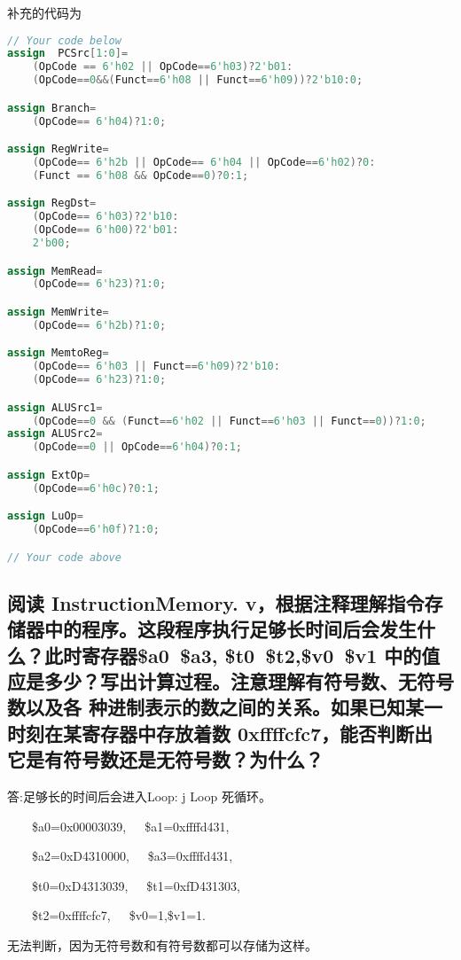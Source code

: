 \documentclass{ctexart}
\begin{document}
        补充的代码为
        	\begin{lstlisting}[language=verilog]
// Your code below
assign 	PCSrc[1:0]=
    (OpCode == 6'h02 || OpCode==6'h03)?2'b01:
    (OpCode==0&&(Funct==6'h08 || Funct==6'h09))?2'b10:0;

assign Branch=
    (OpCode== 6'h04)?1:0;

assign RegWrite=
    (OpCode== 6'h2b || OpCode== 6'h04 || OpCode==6'h02)?0:
    (Funct == 6'h08 && OpCode==0)?0:1;

assign RegDst=
    (OpCode== 6'h03)?2'b10:
    (OpCode== 6'h00)?2'b01:
    2'b00;

assign MemRead=
    (OpCode== 6'h23)?1:0;

assign MemWrite=
    (OpCode== 6'h2b)?1:0;

assign MemtoReg=
    (OpCode== 6'h03 || Funct==6'h09)?2'b10:
    (OpCode== 6'h23)?1:0;

assign ALUSrc1=
    (OpCode==0 && (Funct==6'h02 || Funct==6'h03 || Funct==0))?1:0;
assign ALUSrc2=
    (OpCode==0 || OpCode==6'h04)?0:1;

assign ExtOp=
    (OpCode==6'h0c)?0:1;

assign LuOp=
    (OpCode==6'h0f)?1:0;

// Your code above
    \end{lstlisting}
        \subsection{ 阅读 InstructionMemory.   
        v，根据注释理解指令存储器中的程序。这段程序执行足够长时间后会发生什么？此时寄存器\$a0~\$a3,
        \$t0~\$t2,\$v0~\$v1 中的值应是多少？写出计算过程。注意理解有符号数、无符号数以及各
        种进制表示的数之间的关系。如果已知某一时刻在某寄存器中存放着数 0xffffcfc7，能否判断出
    它是有符号数还是无符号数？为什么？}
            答:足够长的时间后会进入Loop: j Loop 死循环。
            
            ~~~~\$a0=0x00003039,~~~\$a1=0xffffd431,
            
            ~~~~\$a2=0xD4310000,~~~\$a3=0xffffd431,
            
            ~~~~\$t0=0xD4313039,~~~\$t1=0xfD431303,
            
            ~~~~\$t2=0xffffcfc7,~~~\$v0=1,\$v1=1.
            
            无法判断，因为无符号数和有符号数都可以存储为这样。
\end{document}
